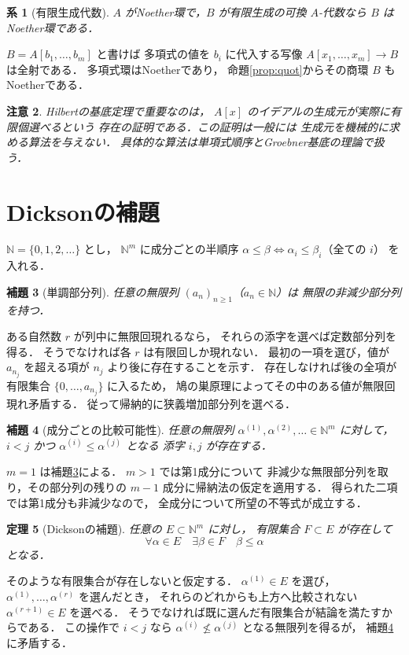 \documentclass[a5paper,10pt,onecolumn]{jsarticle}
\makeatletter
\theoremstyle{mathnotetheorem}
\newtheorem{theorem}{定理}[section]
\newtheorem{lemma}[theorem]{補題}
\newtheorem{corollary}[theorem]{系}
\newtheorem{remark}[theorem]{注意}
\renewcommand{\proofname}{証明}
\renewenvironment{proof}[1][\proofname]{%
  \par\pushQED{\qed}\normalfont\topsep4\p@\@plus2\p@\relax
  \trivlist\item[\hskip\labelsep\bfseries #1]\ignorespaces
}{\popQED\endtrivlist\@endpefalse}
\makeatother
\begin{document}
\begin{corollary}[有限生成代数]
$A$ がNoether環で，$B$ が有限生成の可換 $A$-代数なら
$B$ はNoether環である．
\end{corollary}
\begin{proof}
$B=A[b_1,\ldots,b_m]$ と書けば
多項式の値を $b_i$ に代入する写像
$A[x_1,\ldots,x_m]\to B$ は全射である．
多項式環はNoetherであり，
命題\ref{prop:quot}からその商環 $B$ もNoetherである．
\end{proof}
\begin{remark}
Hilbertの基底定理で重要なのは，
$A[x]$ のイデアルの生成元が実際に有限個選べるという
存在の証明である．この証明は一般には
生成元を機械的に求める算法を与えない．
具体的な算法は単項式順序とGroebner基底の理論で扱う．
\end{remark}

\section{Dicksonの補題}
$\mathbb N=\{0,1,2,\ldots\}$ とし，
$\mathbb N^m$ に成分ごとの半順序
$\alpha\le\beta\iff \alpha_i\le\beta_i$（全ての $i$）
を入れる．
\begin{lemma}[単調部分列]\label{lem:monosub}
任意の無限列 $(a_n)_{n\ge1}$（$a_n\in\mathbb N$）は
無限の非減少部分列を持つ．
\end{lemma}
\begin{proof}
ある自然数 $r$ が列中に無限回現れるなら，
それらの添字を選べば定数部分列を得る．
そうでなければ各 $r$ は有限回しか現れない．
最初の一項を選び，値が $a_{n_j}$ を超える項が
$n_j$ より後に存在することを示す．
存在しなければ後の全項が有限集合
$\{0,\ldots,a_{n_j}\}$ に入るため，
鳩の巣原理によってその中のある値が無限回現れ矛盾する．
従って帰納的に狭義増加部分列を選べる．
\end{proof}
\begin{lemma}[成分ごとの比較可能性]\label{lem:wqo}
任意の無限列
$\alpha^{(1)},\alpha^{(2)},\ldots\in\mathbb N^m$ に対して，
$i<j$ かつ $\alpha^{(i)}\le\alpha^{(j)}$ となる
添字 $i,j$ が存在する．
\end{lemma}
\begin{proof}
$m=1$ は補題\ref{lem:monosub}による．
$m>1$ では第1成分について
非減少な無限部分列を取り，その部分列の残りの
$m-1$ 成分に帰納法の仮定を適用する．
得られた二項では第1成分も非減少なので，
全成分について所望の不等式が成立する．
\end{proof}
\begin{theorem}[Dicksonの補題]\label{thm:dickson}
任意の $E\subset\mathbb N^m$ に対し，
有限集合 $F\subset E$ が存在して
\[
 \forall\alpha\in E\quad
 \exists\beta\in F\quad \beta\le\alpha
\]
となる．
\end{theorem}
\begin{proof}
そのような有限集合が存在しないと仮定する．
$\alpha^{(1)}\in E$ を選び，
$\alpha^{(1)},\ldots,\alpha^{(r)}$ を選んだとき，
それらのどれからも上方へ比較されない
$\alpha^{(r+1)}\in E$ を選べる．
そうでなければ既に選んだ有限集合が結論を満たすからである．
この操作で
$i<j$ なら
$\alpha^{(i)}\not\le\alpha^{(j)}$ となる無限列を得るが，
補題\ref{lem:wqo}に矛盾する．
\end{proof}
\end{document}
